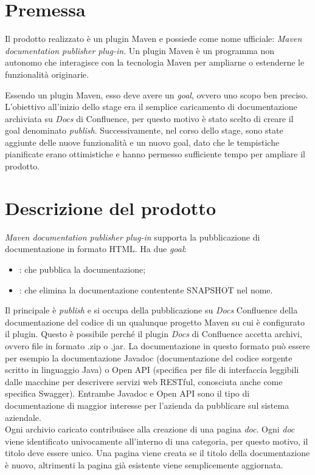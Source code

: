 
\section{Premessa}
Il prodotto realizzato è un plugin Maven e possiede come nome ufficiale: \emph{Maven documentation publisher plug-in}.
Un plugin Maven è un programma non autonomo che interagisce con la tecnologia Maven per ampliarne o estenderne le funzionalità originarie.

Essendo un plugin Maven, esso deve avere un \emph{goal}, ovvero uno scopo ben preciso.
L'obiettivo all'inizio dello stage era il semplice caricamento di documentazione archiviata su \emph{Docs} di Confluence, per questo motivo è stato scelto di creare il goal denominato \emph{publish}.
Successivamente, nel corso dello stage, sono state aggiunte delle nuove funzionalità e un nuovo goal, dato che le tempistiche pianificate erano ottimistiche e hanno permesso sufficiente tempo per ampliare il prodotto.


\section{Descrizione del prodotto}

\emph{Maven documentation publisher plug-in} supporta la pubblicazione di documentazione in formato HTML. Ha due \emph{goal}:
\begin{itemize}
	\item {}: che pubblica la documentazione;
	\item {}: che elimina la documentazione contentente SNAPSHOT nel nome.
\end{itemize}

Il principale è \emph{publish} e si occupa della pubblicazione su  \emph{Docs} Confluence della documentazione del codice di un qualunque progetto Maven su cui è configurato il plugin.
Questo è possibile perché il plugin \emph{Docs} di Confluence accetta archivi, ovvero file in formato .zip o .jar.
La documentazione in questo formato può essere per esempio la documentazione Javadoc (documentazione del codice sorgente scritto in linguaggio Java) o Open API (specifica per file di interfaccia leggibili dalle macchine per descrivere servizi web RESTful, conosciuta anche come specifica Swagger).
Entrambe Javadoc e Open API sono il tipo di documentazione di maggior interesse per l'azienda da pubblicare sul sistema aziendale. \\
Ogni archivio caricato contribuisce alla creazione di una pagina \emph{doc}.
Ogni \emph{doc} viene identificato univocamente all'interno di una categoria, per questo motivo, il titolo deve essere unico.
Una pagina viene creata se il titolo della documentazione è nuovo, altrimenti la pagina già esistente viene semplicemente aggiornata. \\ 
 
